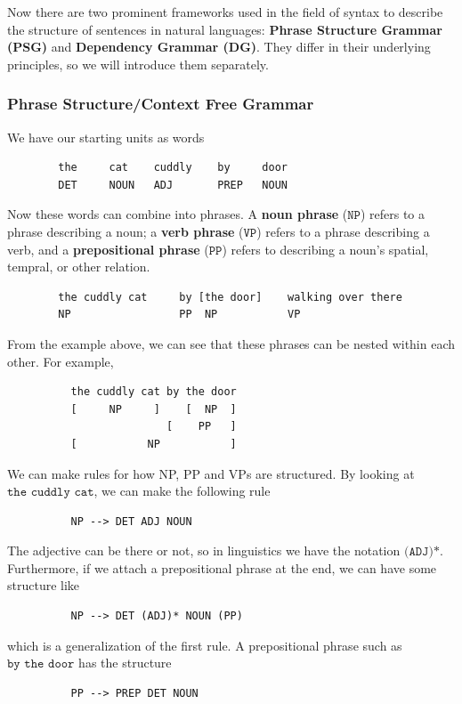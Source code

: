 \documentclass{article}
\begin{document}
      Now there are two prominent frameworks used in the field of syntax to describe the structure of sentences in natural languages: \textbf{Phrase Structure Grammar (PSG)} and \textbf{Dependency Grammar (DG)}. They differ in their underlying principles, so we will introduce them separately. 

    \subsubsection{Phrase Structure/Context Free Grammar}

      We have our starting units as words
      \begin{lstlisting}
        the     cat    cuddly    by     door 
        DET     NOUN   ADJ       PREP   NOUN 
      \end{lstlisting}
      Now these words can combine into phrases. A \textbf{noun phrase} ($\texttt{NP}$) refers to a phrase describing a noun; a \textbf{verb phrase} ($\texttt{VP}$) refers to a phrase describing a verb, and a \textbf{prepositional phrase} ($\texttt{PP}$) refers to describing a noun's spatial, tempral, or other relation. 
      \begin{lstlisting}
        the cuddly cat     by [the door]    walking over there 
        NP                 PP  NP           VP 
      \end{lstlisting}
      From the example above, we can see that these phrases can be nested within each other. For example, 
      \begin{lstlisting}
          the cuddly cat by the door 
          [     NP     ]    [  NP  ]
                         [    PP   ]
          [           NP           ]
      \end{lstlisting}
      We can make rules for how NP, PP and VPs are structured. By looking at $\texttt{the cuddly cat}$, we can make the following rule 
      \begin{lstlisting}
          NP --> DET ADJ NOUN
      \end{lstlisting}
      The adjective can be there or not, so in linguistics we have the notation $\texttt{(ADJ)*}$. Furthermore, if we attach a prepositional phrase at the end, we can have some structure like 
      \begin{lstlisting}
          NP --> DET (ADJ)* NOUN (PP)
      \end{lstlisting}
      which is a generalization of the first rule. A prepositional phrase such as $\texttt{by the door}$ has the structure 
      \begin{lstlisting}
          PP --> PREP DET NOUN
      \end{lstlisting}
\end{document}
